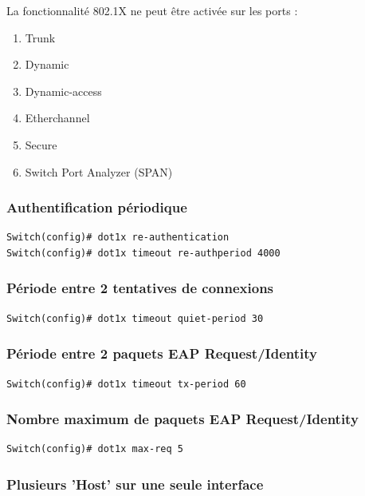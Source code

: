 La fonctionnalité 802.1X ne peut être activée sur les ports :
\begin{enumerate}
\item Trunk
\item Dynamic
\item Dynamic-access
\item Etherchannel
\item Secure
\item Switch Port Analyzer (SPAN)
\end{enumerate}

\subsubsection{Authentification périodique}

\begin{verbatim}
Switch(config)# dot1x re-authentication
Switch(config)# dot1x timeout re-authperiod 4000
\end{verbatim}

\subsubsection{Période entre 2 tentatives de connexions}

\begin{verbatim}
Switch(config)# dot1x timeout quiet-period 30
\end{verbatim}

\subsubsection{Période entre 2 paquets EAP Request/Identity}

\begin{verbatim}
Switch(config)# dot1x timeout tx-period 60
\end{verbatim}

\subsubsection{Nombre maximum de paquets EAP Request/Identity}

\begin{verbatim}
Switch(config)# dot1x max-req 5
\end{verbatim}

\subsubsection{Plusieurs 'Host' sur une seule interface}

